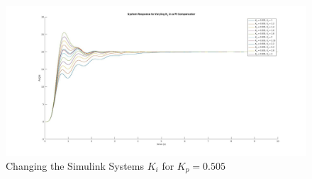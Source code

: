 \documentclass[a4paper, 11pt, compsoc]{IEEEtran}
\begin{document}
			\begin{figure}[!ht]
				\centering
				\includegraphics[width=\columnwidth]{changeK_iInPICompensator.jpg}
				\caption{Changing the Simulink Systems $K_i$ for $K_p = 0.505$}
				\label{fig:lab6PI_Ki_Change}
			\end{figure}
\end{document}
